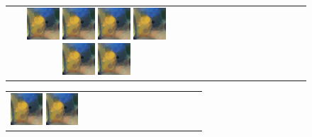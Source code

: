 \documentclass[3p,times,procedia]{elsarticle}
\begin{document}
\begin{figure}[H]
\begin{tabular}{c c c c c c c c c c c c c}
        \includegraphics[width=12mm]{figures/mul/cafe_terrace_at_nightpass32_best.png}
        
        \includegraphics[width=12mm]{figures/mul/cafe_terrace_at_nightpass33_best.png}
        
        \includegraphics[width=12mm]{figures/mul/cafe_terrace_at_nightpass34_best.png}
        
        \includegraphics[width=12mm]{figures/mul/cafe_terrace_at_nightpass35_best.png}
        
        \includegraphics[width=12mm]{figures/mul/cafe_terrace_at_nightpass36_best.png}
        
        \includegraphics[width=12mm]{figures/mul/cafe_terrace_at_nightpass37_best.png}
        \\
    \end{tabular}
    \begin{tabular}{c c c c c c c c c c c c c}
        \includegraphics[width=12mm]{figures/mul/cafe_terrace_at_nightpass38_best.png}
        
        \includegraphics[width=12mm]{figures/mul/cafe_terrace_at_nightpass39_best.png}
        

\end{tabular}
\end{figure}
\end{document}
